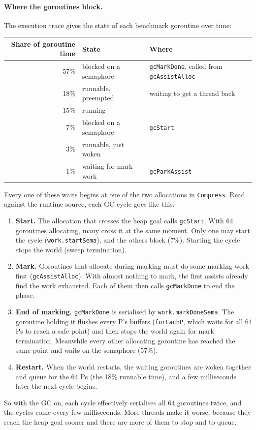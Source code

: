 \documentclass[10pt,a4paper]{article}
\begin{document}
\paragraph{Where the goroutines block.} The execution trace gives the state of each
benchmark goroutine over time:
\begin{center}\small
\begin{tabular}{rll}
\toprule
Share of goroutine time & State & Where \\ \midrule
57\% & blocked on a semaphore & \texttt{gcMarkDone}, called from \texttt{gcAssistAlloc} \\
18\% & runnable, preempted & waiting to get a thread back \\
15\% & running & \\
7\% & blocked on a semaphore & \texttt{gcStart} \\
3\% & runnable, just woken & \\
1\% & waiting for mark work & \texttt{gcParkAssist} \\
\bottomrule
\end{tabular}
\end{center}
Every one of these waits begins at one of the two allocations in \texttt{Compress}. Read
against the runtime source, each GC cycle goes like this:
\begin{enumerate}
  \item \textbf{Start.} The allocation that crosses the heap goal calls \texttt{gcStart}.
    With 64 goroutines allocating, many cross it at the same moment. Only one may start the
    cycle (\texttt{work.startSema}), and the others block (7\%). Starting the cycle stops the
    world (sweep termination).
  \item \textbf{Mark.} Goroutines that allocate during marking must do some marking work
    first (\texttt{gcAssistAlloc}). With almost nothing to mark, the first assists already
    find the work exhausted. Each of them then calls \texttt{gcMarkDone} to end the phase.
  \item \textbf{End of marking.} \texttt{gcMarkDone} is serialised by
    \texttt{work.markDoneSema}. The goroutine holding it flushes every P's buffers
    (\texttt{forEachP}, which waits for all 64 Ps to reach a safe point) and then stops the
    world again for mark termination. Meanwhile every other allocating goroutine has
    reached the same point and waits on the semaphore (57\%).
  \item \textbf{Restart.} When the world restarts, the waiting goroutines are woken
    together and queue for the 64 Ps (the 18\% runnable time), and a few milliseconds
    later the next cycle begins.
\end{enumerate}
So with the GC on, each cycle effectively serialises all 64 goroutines twice, and the cycles
come every few milliseconds. More threads make it worse, because they reach the heap goal
sooner and there are more of them to stop and to queue.
\end{document}
